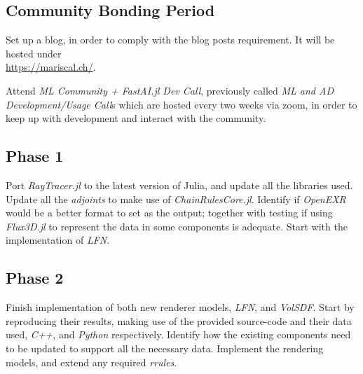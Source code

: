 \subsection*{Community Bonding Period}



Set up a blog, in order to comply with the blog posts requirement. It will be hosted under\\ \url{https://mariscal.ch/}.

Attend \textit{ML Community + FastAI.jl Dev Call}, previously called \textit{ML and AD Development/Usage Call}s which are hosted every two weeks via zoom, in order to keep up with development and interact with the community.

\pagebreak

\subsection*{Phase 1}

Port \textit{RayTracer.jl} to the latest version of Julia, and update all the libraries used. Update all the \textit{adjoints} to make use of \textit{ChainRulesCore.jl}. Identify if \textit{OpenEXR} would be a better format to set as the output; together with testing if using \textit{Flux3D.jl} to represent the data in some components is adequate. Start with the implementation of \textit{LFN}.

\subsection*{Phase 2}

Finish implementation of both new renderer models, \textit{LFN}, and \textit{VolSDF}. Start by reproducing their results, making use of the provided source-code and their data used, \textit{C++}, and \textit{Python} respectively. Identify how the existing components need to be updated to support all the necessary data. Implement the rendering models, and extend any required \textit{rrules}.

